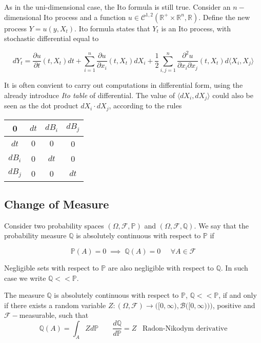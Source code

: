 As in the uni-dimensional case, the Ito formula is still true. Consider an $n-$dimensional Ito process and a function $u \in \mathcal{C}^{1,2}(\mathbb{R}^+ \times \mathbb{R}^n, \mathbb{R})$. Define the new process $Y = u(y,X_t)$. Ito formula states that $Y_t$ is an Ito process, with stochastic differential equal to

\begin{equation}
    dY_t = \frac{\partial u}{\partial t}(t,X_t) dt + \sum_{i=1}^n \frac{\partial u}{\partial x_i}(t,X_t) dX_i + \frac{1}{2} \sum_{i,j=1}^n \frac{\partial^2 u}{\partial x_i \partial x_j}(t,X_t) d\langle X_i, X_j \rangle
\end{equation}

It is often convient to carry out computations in differential form, using the already introduce \textit{Ito table} of differential. The value of $\langle dX_i, dX_j \rangle$ could also be seen as the dot product $dX_i \cdot dX_j$, according to the rules

\begin{table}[h!]
    \centering
    \begin{tabular}{c|c c c}
        0 & $dt$ & $dB_i$ & $dB_j$\\
        \hline
        $dt$ & $0$ & $0$ & 0\\
        $dB_i$ & 0 & $dt$ & 0 \\
        $dB_j$ & 0 & 0 & $dt$ \\
    \end{tabular}
\end{table}

\subsection{Change of Measure}
Consider two probability spaces $(\Omega,\mathcal{F},\mathbb{P})$ and $(\Omega,\mathcal{F},\mathbb{Q})$. We say that the probability measure $\mathbb{Q}$ is absolutely continuous with respect to $\mathbb{P}$ if

\begin{equation*}
    \mathbb{P}(A) = 0 \; \implies \; \mathbb{Q}(A) = 0 \;\;\;\;\; \forall A \in \mathcal{F}
\end{equation*}

Negligible sets with respect to $\mathbb{P}$ are also negligible with respect to $\mathbb{Q}$. In such case we write $\mathbb{Q} << \mathbb{P}$. 

\begin{theorem}
    The measure $\mathbb{Q}$ is absolutely continuous with respect to $\mathbb{P}$, $\mathbb{Q} << \mathbb{P}$, if and only if there exists a random variable $Z : (\Omega,\mathcal{F}) \to \Big( [0,\infty), \mathcal{B}\big([0,\infty)\big) \Big)$, positive and $\mathcal{F}-$measurable, such that
    \begin{equation}
        \mathbb{Q}(A) = \int_A Z d\mathbb{P} \;\;\;\;\;\;\; \frac{d\mathbb{Q}}{d\mathbb{P}} = Z \;\;\; \text{Radon-Nikodym derivative}
    \end{equation}
\end{theorem}

